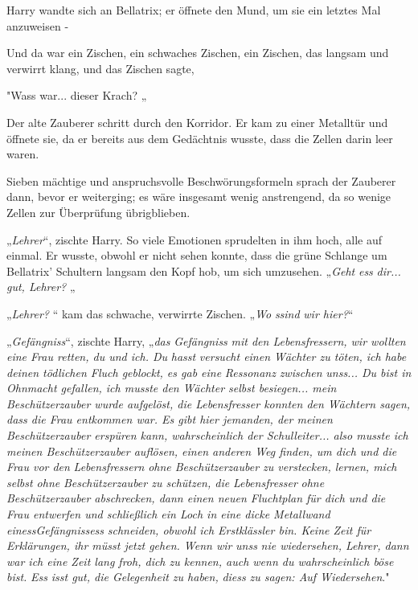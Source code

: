 {Harry wandte sich an Bellatrix; er öffnete den Mund, um sie ein letztes Mal anzuweisen -

Und da war ein Zischen, ein schwaches Zischen, ein Zischen, das langsam und verwirrt klang, und das Zischen sagte,

"Wass war... dieser Krach? „

Der alte Zauberer schritt durch den Korridor. Er kam zu einer Metalltür und öffnete sie, da er bereits aus dem Gedächtnis wusste, dass die Zellen darin leer waren.

Sieben mächtige und anspruchsvolle Beschwörungsformeln sprach der Zauberer dann, bevor er weiterging; es wäre insgesamt wenig anstrengend, da so wenige Zellen zur Überprüfung übrigblieben.

„\emph{Lehrer}“, zischte Harry. So viele Emotionen sprudelten in ihm hoch, alle auf einmal. Er wusste, obwohl er nicht sehen konnte, dass die grüne Schlange um Bellatrix' Schultern langsam den Kopf hob, um sich umzusehen. „\emph{Geht} \emph{ess} \emph{dir... gut, Lehrer?} „

„\emph{Lehrer?} “ kam das schwache, verwirrte Zischen. „\emph{Wo} \emph{ssind} \emph{wir hier?}“

„\emph{Gefängniss}“, zischte Harry, „\emph{das} \emph{Gefängniss} \emph{mit den Lebensfressern, wir wollten eine Frau retten, du und ich. Du} \emph{hasst} \emph{versucht einen Wächter zu töten, ich habe deinen tödlichen Fluch geblockt, es gab eine} \emph{Ressonanz} \emph{zwischen} \emph{unss... Du bist in Ohnmacht gefallen, ich musste den Wächter selbst besiegen... mein Beschützerzauber wurde aufgelöst, die Lebensfresser konnten den Wächtern sagen, dass die Frau entkommen war. Es gibt hier jemanden, der meinen Beschützerzauber erspüren kann, wahrscheinlich der Schulleiter... also musste ich meinen Beschützerzauber auflösen, einen anderen Weg finden, um dich und die Frau vor den} \emph{Lebensfressern} \emph{ohne Beschützerzauber zu verstecken, lernen, mich selbst ohne} \emph{Beschützerzauber zu schützen, die} \emph{Lebensfresser} \emph{ohne Beschützerzauber abschrecken, dann einen neuen Fluchtplan für dich und die Frau entwerfen und schließlich ein Loch in eine dicke Metallwand} \emph{einessGefängnissess} \emph{schneiden, obwohl ich Erstklässler bin. Keine Zeit für Erklärungen, ihr müsst jetzt gehen. Wenn wir} \emph{unss} \emph{nie wiedersehen, Lehrer, dann war ich eine Zeit lang froh, dich zu kennen, auch wenn du wahrscheinlich böse bist.} \emph{Ess} \emph{isst gut, die Gelegenheit zu haben,} \emph{diess} \emph{zu sagen: Auf Wiedersehen}."

}
